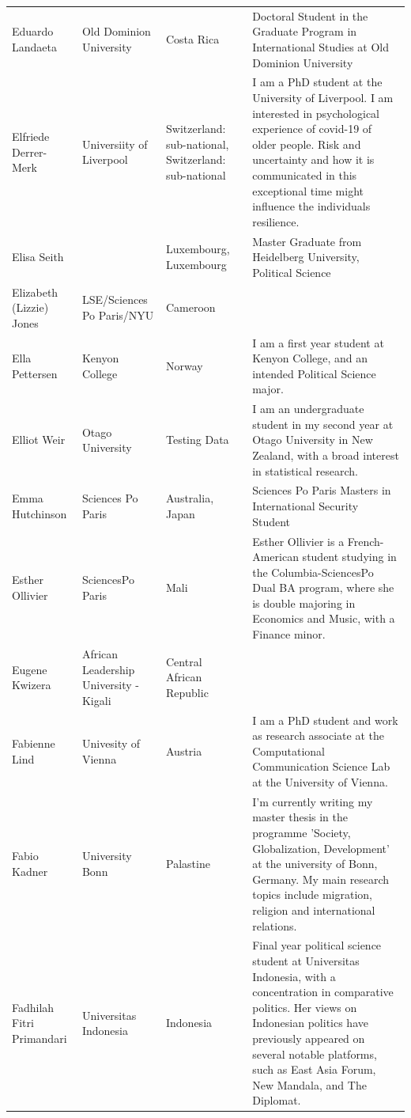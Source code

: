 \documentclass[]{article}
\begin{document}
\begin{longtable}{l>{\raggedright\arraybackslash}p{2cm}>{\raggedright\arraybackslash}p{2cm}>{\raggedright\arraybackslash}p{3cm}}
\rowcolor{gray!6}  Eduardo Landaeta & Old Dominion University & Costa Rica & Doctoral Student in the Graduate Program in International Studies at Old Dominion University\\
Elfriede Derrer-Merk & Universiity of Liverpool & Switzerland: sub-national, Switzerland: sub-national & I am a PhD student at the University of Liverpool. I am interested in psychological experience of covid-19 of older people. Risk and uncertainty and how it is communicated in this exceptional time might influence the individuals resilience.\\
\rowcolor{gray!6}  Elisa Seith &  & Luxembourg, Luxembourg & Master Graduate from Heidelberg University, Political Science\\
Elizabeth (Lizzie) Jones & LSE/Sciences Po Paris/NYU & Cameroon & \\
\addlinespace
\rowcolor{gray!6}  Ella Pettersen & Kenyon College & Norway & I am a first year student at Kenyon College, and an intended Political Science major.\\
Elliot Weir & Otago University & Testing Data & I am an undergraduate student in my second year at Otago University in New Zealand, with a broad interest in statistical research.\\
\rowcolor{gray!6}  Emma Hutchinson & Sciences Po Paris & Australia, Japan & Sciences Po Paris Masters in International Security Student\\
Esther Ollivier & SciencesPo Paris & Mali & Esther Ollivier is a French-American student studying in the Columbia-SciencesPo Dual BA program, where she is double majoring in Economics and Music, with a Finance minor.\\
\rowcolor{gray!6}  Eugene Kwizera & African Leadership University - Kigali & Central African Republic & \\
\addlinespace
Fabienne Lind & Univesity of Vienna & Austria & I am a PhD student and work as research associate at the Computational Communication Science Lab at the University of Vienna.\\
\rowcolor{gray!6}  Fabio Kadner & University Bonn & Palastine & I'm currently writing my master thesis in the programme 'Society, Globalization, Development' at the university of Bonn, Germany. My main research topics include migration, religion and international relations.\\
Fadhilah Fitri Primandari & Universitas Indonesia & Indonesia & Final year political science student at Universitas Indonesia, with a concentration in comparative politics. Her views on Indonesian politics have previously appeared on several notable platforms, such as East Asia Forum, New Mandala, and The Diplomat.\\

\end{longtable}
\end{document}
